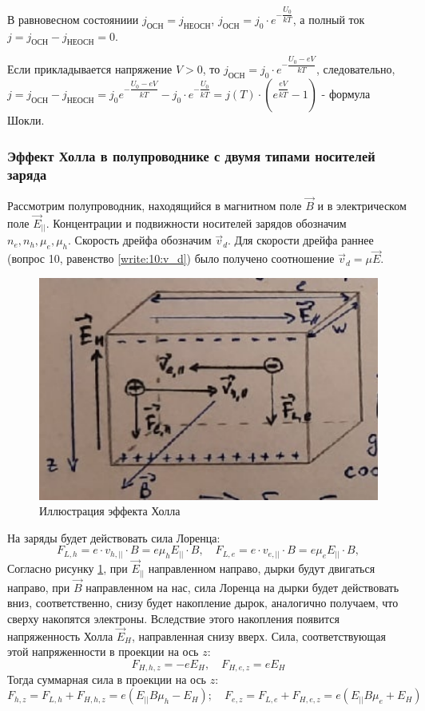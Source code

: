В равновесном состояниии $j_\text{ОСН} = j_\text{НЕОСН}$, $j_\text{ОСН} = j_0 \cdot e^{-\dfrac{U_0}{kT}}$, а полный ток $j = j_\text{ОСН} - j_\text{НЕОСН} = 0$.

Если прикладывается напряжение $V>0$, то $j_\text{ОСН} = j_0 \cdot e^{-\dfrac{U_0-eV}{kT}}$, следовательно, $j = j_\text{ОСН} - j_\text{НЕОСН} = j_0 e^{-\dfrac{U_0-eV}{kT}} - j_0 \cdot e^{-\dfrac{U_0}{kT}} = j(T) \cdot \left( e^{\dfrac{eV}{kT}} - 1 \right) $ - формула Шокли.

\subsubsection{Эффект Холла в полупроводнике с двумя типами носителей заряда}

Рассмотрим полупроводник, находящийся в магнитном поле $\vec{B}$ и в электрическом поле
$\vec{E}_{||}$.  Концентрации и подвижности носителей зарядов обозначим $n_e, n_h, \mu_e, \mu_h$.
Скорость дрейфа обозначим $\vec{v}_d$. Для скорости дрейфа раннее (вопрос 10, равенство
\eqref{write:10:v_d}) было получено соотношение $\vec{v}_d = \mu \vec{E}$.

\begin{figure}[H]
  \centering
  \includegraphics[width=0.9\linewidth]{img/oral-04/hall-effect.png}
  \caption{Иллюстрация эффекта Холла}
  \label{fig:halleffect}
\end{figure}

На заряды будет действовать сила Лоренца:
\[
  F_{L, h} = e \cdot v_{h, ||} \cdot B = e \mu_h E_{||} \cdot B,\quad
  F_{L, e} = e \cdot v_{e, ||} \cdot B = e \mu_e E_{||} \cdot B,
\]
Согласно рисунку \ref{fig:halleffect}, при $\vec{E}_{||}$ направленном направо, дырки будут 
двигаться направо, при $\vec{B}$ направленном на нас, сила Лоренца на дырки будет действовать вниз,
соответственно, снизу будет накопление дырок, аналогично получаем, что сверху накопятся электроны.
Вследствие этого накопления появится напряженность Холла $\vec{E}_H$, направленная снизу вверх.
Сила, соответствующая этой напряженности в проекции на ось $z$:
\[
  F_{H, h, z} = -e E_{H}, \quad
  F_{H, e, z} = e E_{H}
\]
Тогда суммарная сила в проекции на ось $z$:
\[
  F_{h, z} = F_{L, h} + F_{H, h, z} = e \left( E_{||} B \mu_h - E_H \right); \quad
  F_{e, z} = F_{L, e} + F_{H, e, z} = e \left( E_{||} B \mu_e + E_H \right)
\]

